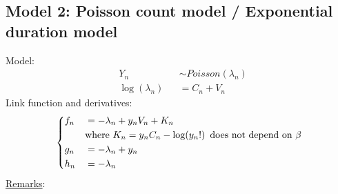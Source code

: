 \documentclass[12pt]{article}
\begin{document}
\subsection{Model 2: Poisson count model / Exponential duration model}
Model:
\begin{equation}
\begin{aligned}
	& Y_n && \sim Poisson(\lambda_n) \\
	& \log(\lambda_n) && = C_n + V_n
\end{aligned}
\end{equation}
Link function and derivatives:
\begin{equation}
\left\{ \begin{aligned}
	& f_n && =  - \lambda_n + y_n V_n + K_n  \\
	& && \text{where } K_n =  y_n C_n - \log(y_n!) \hspace*{5pt} \text{does not depend on } \beta \\
	& g_n && =  - \lambda_n + y_n \\
	& h_n && =  - \lambda_n \\
\end{aligned} \right.
\end{equation}
\underline{Remarks}:
\end{document}
